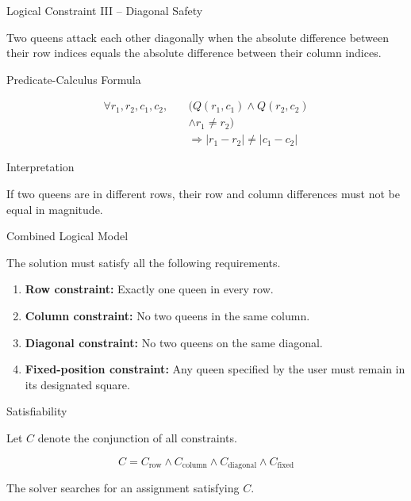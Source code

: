 \documentclass[aspectratio=169,12pt]{beamer}
\begin{document}
\begin{frame}{Logical Constraint III -- Diagonal Safety}

Two queens attack each other diagonally when the absolute
difference between their row indices equals the absolute
difference between their column indices.

\begin{block}{Predicate-Calculus Formula}

\[
\begin{aligned}
\forall r_1,r_2,c_1,c_2,\quad
&\big(Q(r_1,c_1)\land Q(r_2,c_2)\\
&\land r_1\ne r_2\big)\\
&\Rightarrow |r_1-r_2|\ne |c_1-c_2|
\end{aligned}
\]

\end{block}

\begin{exampleblock}{Interpretation}

If two queens are in different rows, their row and column
differences must not be equal in magnitude.
\end{exampleblock}

\end{frame}


\begin{frame}{Combined Logical Model}

The solution must satisfy all the following requirements.

\begin{enumerate}
    \item \textbf{Row constraint:} Exactly one queen in
          every row.
    \item \textbf{Column constraint:} No two queens in
          the same column.
    \item \textbf{Diagonal constraint:} No two queens
          on the same diagonal.
    \item \textbf{Fixed-position constraint:} Any queen
          specified by the user must remain in its
          designated square.
\end{enumerate}

\begin{block}{Satisfiability}

Let $C$ denote the conjunction of all constraints.

\[
C = C_{\text{row}}\land C_{\text{column}}
    \land C_{\text{diagonal}}\land C_{\text{fixed}}
\]

The solver searches for an assignment satisfying $C$.
\end{block}

\end{frame}
\end{document}
